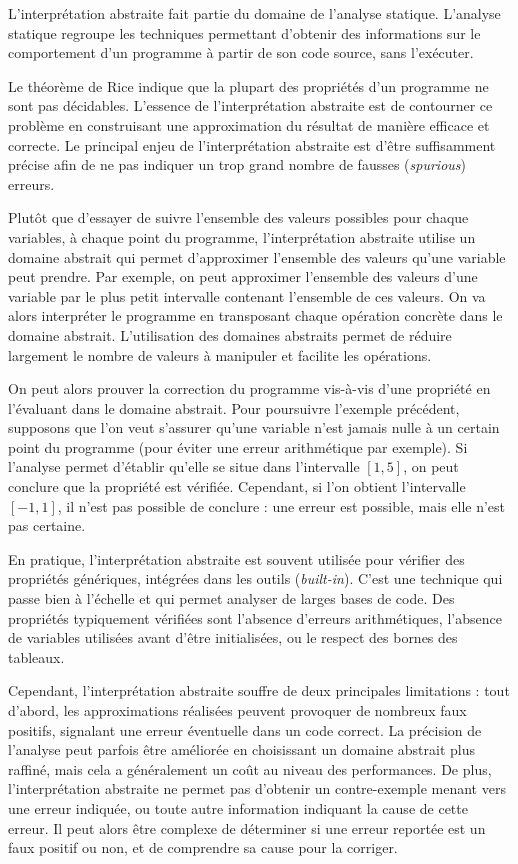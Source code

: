 L'interprétation abstraite fait partie du domaine de l'analyse statique.
L'analyse statique regroupe les techniques permettant d'obtenir des
informations sur le comportement d'un programme à partir de son code
source, sans l'exécuter.

Le théorème de Rice indique que la plupart des propriétés d'un programme
ne sont pas décidables. L'essence de l'interprétation abstraite est de
contourner ce problème en construisant une approximation du résultat de
manière efficace et correcte. Le principal enjeu de
l'interprétation abstraite est d'être suffisamment précise afin de ne
pas indiquer un trop grand nombre de fausses (\emph{spurious}) erreurs.

Plutôt que d'essayer de suivre l'ensemble des valeurs possibles pour chaque
variables, à chaque point du programme, l'interprétation abstraite utilise un
domaine abstrait qui permet d'approximer l'ensemble des valeurs qu'une variable
peut prendre. Par exemple, on peut approximer l'ensemble des valeurs d'une
variable par le plus petit intervalle contenant l'ensemble de ces valeurs. On va
alors interpréter le programme en transposant chaque opération concrète dans le
domaine abstrait. L'utilisation des domaines abstraits permet de réduire
largement le nombre de valeurs à manipuler et facilite les opérations.

On peut alors prouver la correction du programme vis-à-vis d'une
propriété en l'évaluant dans le domaine abstrait. Pour poursuivre
l'exemple précédent, supposons que l'on veut s'assurer qu'une variable n'est jamais
nulle à un certain point du programme (pour éviter une erreur arithmétique
par exemple). Si l'analyse permet d'établir qu'elle se situe dans
l'intervalle \([1, 5]\), on peut conclure que la propriété est vérifiée.
Cependant, si l'on obtient l'intervalle \([-1, 1]\), il n'est pas possible
de conclure : une erreur est possible, mais elle n'est pas certaine.

En pratique, l'interprétation abstraite est souvent utilisée pour
vérifier des propriétés génériques, intégrées dans les outils
(\emph{built-in}). C'est une technique qui
passe bien à l'échelle et qui permet analyser de larges bases de code. Des
propriétés typiquement vérifiées sont l'absence d'erreurs arithmétiques,
l'absence de variables utilisées avant d'être initialisées, ou le
respect des bornes des tableaux.

Cependant, l'interprétation abstraite souffre de deux principales limitations
: tout d'abord, les approximations réalisées peuvent provoquer de
nombreux faux positifs, signalant une erreur éventuelle dans un code
correct. La précision de l'analyse peut parfois être améliorée en
choisissant un domaine abstrait plus raffiné, mais cela a généralement
un coût au niveau des performances. De plus, l'interprétation abstraite
ne permet pas d'obtenir un contre-exemple menant vers une erreur
indiquée, ou toute autre information indiquant la cause de cette erreur.
Il peut alors être complexe de déterminer si une erreur reportée est un
faux positif ou non, et de comprendre sa cause pour la corriger.

